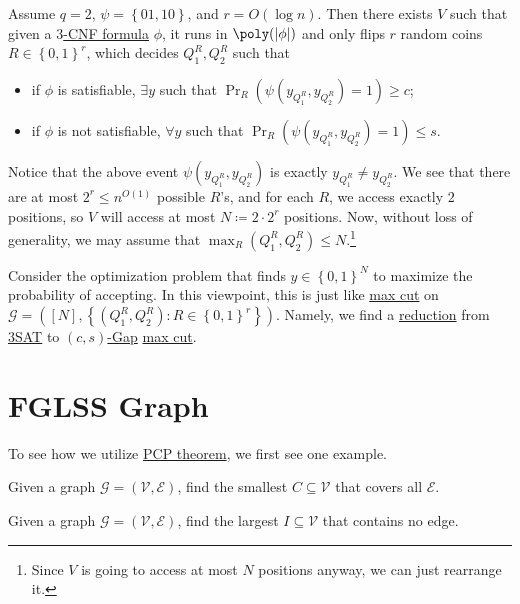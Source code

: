 Assume \(q = 2\), \(\psi = \left\{ 01, 10 \right\} \), and \(r = O(\log n)\). Then there exists \(V\) such that given a \hyperref[def:k-CNF]{\(3\)-CNF formula} \(\phi \), it runs in \(\poly(\vert \phi  \vert )\) and only flips \(r\) random coins \(R\in \left\{ 0, 1 \right\} ^r\), which decides \(Q_1^R, Q_2^R\) such that
\begin{itemize}
	\item if \(\phi \) is satisfiable, \(\exists y\) such that \(\Pr_{R}(\psi (y_{Q_1^R}, y_{Q_2^R}) = 1) \geq c\);
	\item if \(\phi \) is not satisfiable, \(\forall y\) such that \(\Pr_{R}(\psi (y_{Q_1^R}, y_{Q_2^R}) = 1) \leq s\).
\end{itemize}
Notice that the above event \(\psi (y_{Q_1^R}, y_{Q_2^R})\) is exactly \(y_{Q_1^R} \neq y_{Q_2^R}\). We see that there are at most \(2^r \leq n^{O(1)}\) possible \(R\)'s, and for each \(R\), we access exactly \(2\) positions, so \(V\) will access at most \(N\coloneqq 2\cdot 2^r\) positions. Now, without loss of generality, we may assume that \(\max _R (Q_1^R, Q_2^R) \leq N\).\footnote{Since \(V\) is going to access at most \(N\) positions anyway, we can just rearrange it.}

Consider the optimization problem that finds \(y\in \left\{ 0, 1 \right\} ^N\) to maximize the probability of accepting. In this viewpoint, this is just like \hyperref[prb:max-cut]{max cut} on \(\mathcal{G} =([N], \left\{ (Q_1^R, Q_2^R)\colon R\in \left\{ 0, 1 \right\} ^r \right\} )\). Namely, we find a \hyperref[def:reduction]{reduction} from \hyperref[prb:max-3SAT]{3SAT} to \hyperref[def:c-s-Gap]{\((c, s)\)-Gap} \hyperref[prb:max-cut]{max cut}.

\section{FGLSS Graph}
To see how we utilize \hyperref[thm:PCP]{PCP theorem}, we first see one example.
\begin{problem}\label{prb:vertex-cover}
Given a graph \(\mathcal{G} =(\mathcal{V} , \mathcal{E} )\), find the smallest \(C \subseteq \mathcal{V} \) that covers all \(\mathcal{E} \).
\end{problem}

\begin{problem}\label{prb:independent-set}
Given a graph \(\mathcal{G} =(\mathcal{V} , \mathcal{E} )\), find the largest \(I \subseteq \mathcal{V} \) that contains no edge.
\end{problem}

